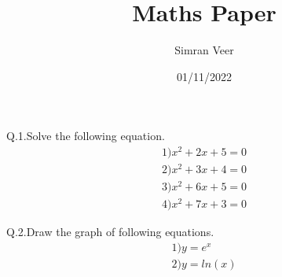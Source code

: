 \documentclass[12 pt]{article}
\begin{document}
  
	\title{Maths Paper}
	\author{Simran Veer}
	\date{01/11/2022}
	\maketitle
	\newpage
	Q.1.Solve the following equation.\\
	\begin{align*}
		1)x^2+2x+5=0 \\
		2)x^2+3x+4=0 \\
		3)x^2+6x+5=0 \\
		4)x^2+7x+3=0 
	\end{align*}
	
	Q.2.Draw the graph of following equations.\\
	\begin{align*}
		1)y=e^x\\
		2)y=ln(x)
	\end{align*}
	
\end{document}
